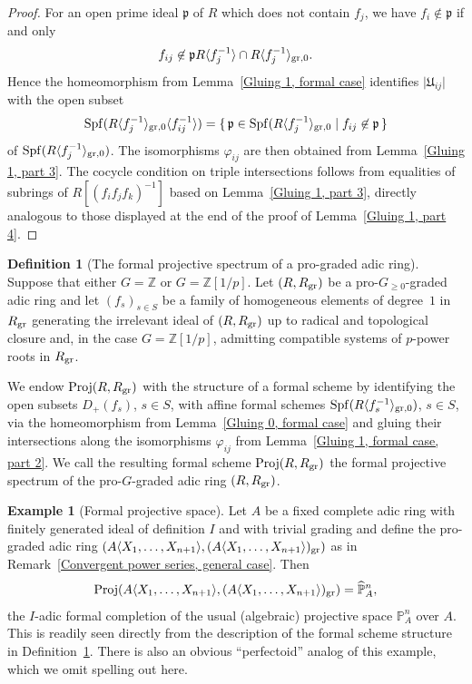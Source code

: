 \documentclass[12pt,twoside,a4paper]{article}
\theoremstyle{definition}
\newtheorem{mydef}[thm]{Definition}
\newtheorem{example}[thm]{Example}
\theoremstyle{remark}
\newcommand\gr{{\rm gr}}
\newcommand\Proj{{\rm Proj}}
\newcommand\Spf{{\rm Spf}}
\begin{document}
\begin{proof}For an open prime ideal $\mathfrak{p}$ of $R$ which does not contain $f_{j}$, we have $f_{i}\not\in \mathfrak{p}$ if and only \begin{equation*}f_{ij}\not\in \mathfrak{p}R\langle f_{j}^{-1}\rangle\cap R\langle f_{j}^{-1}\rangle_{\gr,0}.\end{equation*}
Hence the homeomorphism from Lemma~\ref{Gluing 1, formal case} identifies $\vert \mathfrak{U}_{ij}\vert$ with the open subset \begin{equation*}\Spf(R\langle f_{j}^{-1}\rangle_{\gr,0}\langle f_{ij}^{-1}\rangle)=\{\, \mathfrak{p}\in \Spf(R\langle f_{j}^{-1}\rangle_{\gr,0}\mid f_{ij}\not\in \mathfrak{p}\,\}\end{equation*}of $\Spf(R\langle f_{j}^{-1}\rangle_{\gr,0})$. The isomorphisms $\varphi_{ij}$ are then obtained from Lemma~\ref{Gluing 1, part 3}. The cocycle condition on triple intersections follows from equalities of subrings of $R[(f_{i}f_{j}f_{k})^{-1}]$ based on Lemma~\ref{Gluing 1, part 3}, directly analogous to those displayed at the end of the proof of Lemma~\ref{Gluing 1, part 4}. \end{proof}
\begin{mydef}[The formal projective spectrum of a pro-graded adic ring]\label{Formal Proj, part 2}Suppose that either $G=\mathbb{Z}$ or $G=\mathbb{Z}[1/p]$. Let $(R, R_{\gr})$ be a pro-$G_{\geq0}$-graded adic ring and let $(f_{s})_{s\in S}$ be a family of homogeneous elements of degree~$1$ in $R_{\gr}$ generating the irrelevant ideal of $(R, R_{\gr})$ up to radical and topological closure and, in the case $G=\mathbb{Z}[1/p]$, admitting compatible systems of $p$-power roots in $R_{\gr}$. 

We endow $\Proj(R, R_{\gr})$ with the structure of a formal scheme by identifying the open subsets $D_{+}(f_{s})$, $s\in S$, with affine formal schemes $\Spf(R\langle f_{s}^{-1}\rangle_{\gr, 0})$, $s\in S$, via the homeomorphism from Lemma~\ref{Gluing 0, formal case} and gluing their intersections along the isomorphisms $\varphi_{ij}$ from Lemma~\ref{Gluing 1, formal case, part 2}. We call the resulting formal scheme $\Proj(R, R_{\gr})$ the formal projective spectrum of the pro-$G$-graded adic ring $(R, R_{\gr})$. \end{mydef}
\begin{example}[Formal projective space]\label{Formal projective space}Let $A$ be a fixed complete adic ring with finitely generated ideal of definition $I$ and with trivial grading and define the pro-graded adic ring $(A\langle X_1,\dots, X_{n+1}\rangle, (A\langle X_1,\dots, X_{n+1}\rangle)_{\gr})$ as in Remark~\ref{Convergent power series, general case}. Then \begin{equation*}\Proj(A\langle X_{1},\dots, X_{n+1}\rangle, (A\langle X_{1},\dots, X_{n+1}\rangle)_{\gr})=\widehat{\mathbb{P}}_{A}^{n},\end{equation*}the $I$-adic formal completion of the usual (algebraic) projective space $\mathbb{P}_{A}^{n}$ over $A$. This is readily seen directly from the description of the formal scheme structure in Definition~\ref{Formal Proj, part 2}. There is also an obvious ``perfectoid'' analog of this example, which we omit spelling out here.\end{example}
\end{document}
